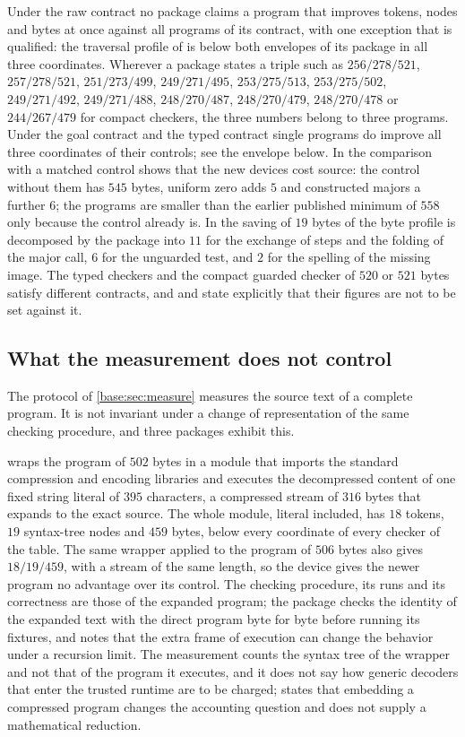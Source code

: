 Under the raw contract no package claims a program that improves tokens,
nodes and bytes at once against all programs of its contract, with one
exception that is qualified: the traversal profile of  is
below both envelopes of its package in all three coordinates. Wherever a
package states a triple such as $256/278/521$, $257/278/521$, $251/273/499$,
$249/271/495$, $253/275/513$, $253/275/502$, $249/271/492$, $249/271/488$,
$248/270/487$, $248/270/479$, $248/270/478$ or $244/267/479$ for compact
checkers, the three numbers belong to three programs. Under the goal contract
and the typed contract single programs do improve all three coordinates of
their controls; see the envelope below. In  the comparison with a matched control
shows that the new devices cost source: the control without them has $545$
bytes, uniform zero adds $5$ and constructed majors a further $6$; the
programs are smaller than the earlier published minimum of $558$ only because
the control already is. In  the saving of $19$
bytes of the byte profile is decomposed by the package into $11$ for the
exchange of steps and the folding of the major call, $6$ for the unguarded
test, and $2$ for the spelling of the missing image. The typed checkers and
the compact guarded checker of $520$ or $521$ bytes satisfy different
contracts, and  and  state
explicitly that their figures are not to be set against it.

\subsection{What the measurement does not control}\label{cert:sec:representation}

The protocol of \cref{base:sec:measure} measures the source text of a complete
program. It is not invariant under a change of representation of the same
checking procedure, and three packages exhibit this.

 wraps the program of $502$ bytes in a module that
imports the standard compression and encoding libraries and executes the
decompressed content of one fixed string literal of $395$ characters, a
compressed stream of $316$ bytes that expands to the exact source. The whole
module, literal included, has $18$ tokens, $19$ syntax-tree nodes and $459$
bytes, below every coordinate of every checker of the table. The same wrapper
applied to the program of $506$ bytes also gives $18/19/459$, with a stream of
the same length, so the device gives the newer program no advantage over its
control. The checking procedure, its runs and its correctness are those of the
expanded program; the package checks the identity of the expanded text with the
direct program byte for byte before running its fixtures, and notes that the
extra frame of execution can change the behavior under a recursion limit. The
measurement counts the syntax tree of the wrapper and not that of the program
it executes, and it does not say how generic decoders that enter the trusted
runtime are to be charged;  states that embedding a
compressed program changes the accounting question and does not supply a
mathematical reduction.

